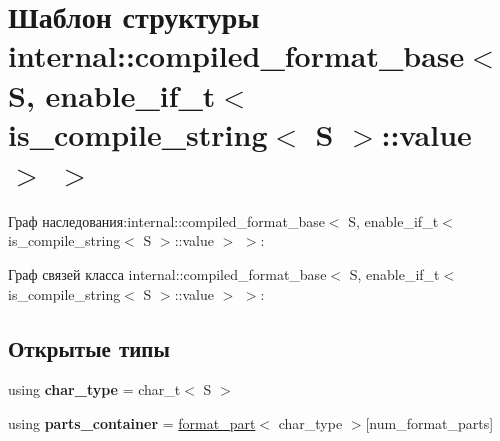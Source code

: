 \hypertarget{structinternal_1_1compiled__format__base_3_01S_00_01enable__if__t_3_01is__compile__string_3_01S_01_4_1_1value_01_4_01_4}{}\section{Шаблон структуры internal\+:\+:compiled\+\_\+format\+\_\+base$<$ S, enable\+\_\+if\+\_\+t$<$ is\+\_\+compile\+\_\+string$<$ S $>$\+:\+:value $>$ $>$}
\label{structinternal_1_1compiled__format__base_3_01S_00_01enable__if__t_3_01is__compile__string_3_01S_01_4_1_1value_01_4_01_4}


Граф наследования\+:internal\+:\+:compiled\+\_\+format\+\_\+base$<$ S, enable\+\_\+if\+\_\+t$<$ is\+\_\+compile\+\_\+string$<$ S $>$\+:\+:value $>$ $>$\+:


Граф связей класса internal\+:\+:compiled\+\_\+format\+\_\+base$<$ S, enable\+\_\+if\+\_\+t$<$ is\+\_\+compile\+\_\+string$<$ S $>$\+:\+:value $>$ $>$\+:
\subsection*{Открытые типы}
\begin{DoxyCompactItemize}
\item 
\mbox{\label{structinternal_1_1compiled__format__base_3_01S_00_01enable__if__t_3_01is__compile__string_3_01S_01_4_1_1value_01_4_01_4_ae887a51434015dd7e9fa6394add151aa}} 
using {\bfseries char\+\_\+type} = char\+\_\+t$<$ S $>$
\item 
\mbox{\label{structinternal_1_1compiled__format__base_3_01S_00_01enable__if__t_3_01is__compile__string_3_01S_01_4_1_1value_01_4_01_4_aee1a4fbbaa68a8d5edf46cf25ca949f3}} 
using {\bfseries parts\+\_\+container} = \hyperlink{structinternal_1_1format__part}{format\+\_\+part}$<$ char\+\_\+type $>$\mbox{[}num\+\_\+format\+\_\+parts\mbox{]}
\end{DoxyCompactItemize}
